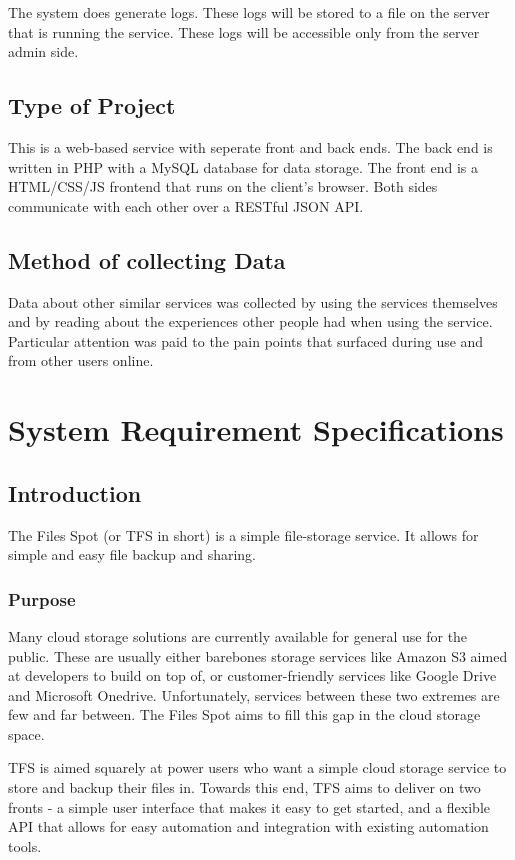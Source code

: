 \documentclass[12pt,a4paper]{report}
\begin{document}
The system does generate logs. These logs will be stored to a file on the server that is running the service. These logs will be accessible only from the server admin side.
\section{Type of Project}\label{sec:type_of_project}
This is a web-based service with seperate front and back ends. The back end is written in PHP with a MySQL database for data storage. The front end is a HTML/CSS/JS frontend that runs on the client's browser. Both sides communicate with each other over a RESTful JSON API.
\section{Method of collecting Data}\label{sec:method_of_collecting_data}
Data about other similar services was collected by using the services themselves and by reading about the experiences other people had when using the service. Particular attention was paid to the pain points that surfaced during use and from other users online.
\newpage
\chapter{System Requirement Specifications}\label{cha:system_requirement_specifications}
\section{Introduction}\label{sec:introduction}
The Files Spot (or TFS in short) is a simple file-storage service.
It allows for simple and easy file backup and sharing.
\subsection{Purpose}
Many cloud storage solutions are currently available for general use for the public. These are usually either barebones storage services like Amazon S3 aimed at developers to build on top of, or customer-friendly services like Google Drive and Microsoft Onedrive. Unfortunately, services between these two extremes are few and far between. The Files Spot aims to fill this gap in the cloud storage space.

TFS is aimed squarely at power users who want a simple cloud storage service to store and backup their files in. Towards this end, TFS aims to deliver on two fronts - a simple user interface that makes it easy to get started, and a flexible API that allows for easy automation and integration with existing automation tools.
\end{document}
